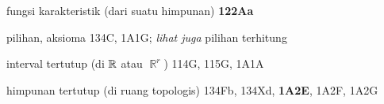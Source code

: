 


























fungsi karakteristik (dari suatu himpunan) {\bf 122Aa}











pilihan, aksioma 134C, 1A1G; 
 {\it lihat juga} pilihan terhitung





























interval tertutup (di $\Bbb R$ atau $\BbbR^r$) 114G, 115G, 1A1A

himpunan tertutup (di ruang topologis) 134Fb, 134Xd, {\bf 1A2E}, 1A2F,
1A2G















